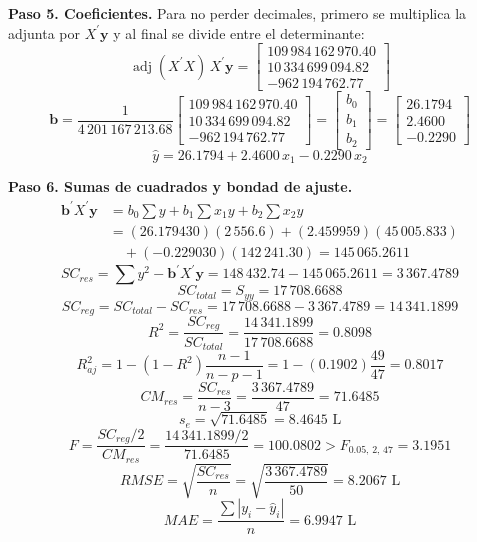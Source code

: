\documentclass[12pt,letterpaper]{article}
\begin{document}
\textbf{Paso 5. Coeficientes.} Para no perder decimales, primero se multiplica la adjunta por $X^{\prime}\mathbf{y}$ y al final se divide entre el determinante:
$$ \operatorname{adj}(X^{\prime}X)\,X^{\prime}\mathbf{y} = \begin{bmatrix} 109\,984\,162\,970.40 \\ 10\,334\,699\,094.82 \\ -962\,194\,762.77 \end{bmatrix} $$
$$ \mathbf{b} = \frac{1}{4\,201\,167\,213.68}\begin{bmatrix} 109\,984\,162\,970.40 \\ 10\,334\,699\,094.82 \\ -962\,194\,762.77 \end{bmatrix} = \begin{bmatrix} b_0 \\ b_1 \\ b_2 \end{bmatrix} = \begin{bmatrix} 26.1794 \\ 2.4600 \\ -0.2290 \end{bmatrix} $$
$$ \boxed{\hat{y} = 26.1794 + 2.4600\,x_1 - 0.2290\,x_2} $$


\textbf{Paso 6. Sumas de cuadrados y bondad de ajuste.}
$$ \begin{aligned} \mathbf{b}^{\prime}X^{\prime}\mathbf{y} &= b_0 \textstyle\sum y + b_1 \sum x_1 y + b_2 \sum x_2 y \\ &= (26.179430)(2\,556.6) + (2.459959)(45\,005.833) \\ &\quad + (-0.229030)(142\,241.30) = 145\,065.2611 \end{aligned} $$
$$ SC_{res} = \sum y^2 - \mathbf{b}^{\prime}X^{\prime}\mathbf{y} = 148\,432.74 - 145\,065.2611 = 3\,367.4789 $$
$$ SC_{total} = S_{yy} = 17\,708.6688 $$
$$ SC_{reg} = SC_{total} - SC_{res} = 17\,708.6688 - 3\,367.4789 = 14\,341.1899 $$
$$ R^2 = \frac{SC_{reg}}{SC_{total}} = \frac{14\,341.1899}{17\,708.6688} = 0.8098 $$
$$ R^2_{aj} = 1 - (1 - R^2)\frac{n - 1}{n - p - 1} = 1 - (0.1902)\frac{49}{47} = 0.8017 $$
$$ CM_{res} = \frac{SC_{res}}{n - 3} = \frac{3\,367.4789}{47} = 71.6485 $$
$$ s_e = \sqrt{71.6485} = 8.4645 \text{ L} $$
$$ F = \frac{SC_{reg}/2}{CM_{res}} = \frac{14\,341.1899/2}{71.6485} = 100.0802 > F_{0.05,\,2,\,47} = 3.1951 $$
$$ RMSE = \sqrt{\frac{SC_{res}}{n}} = \sqrt{\frac{3\,367.4789}{50}} = 8.2067 \text{ L} $$
$$ MAE = \frac{\sum |y_i - \hat{y}_i|}{n} = 6.9947 \text{ L} $$
\end{document}
